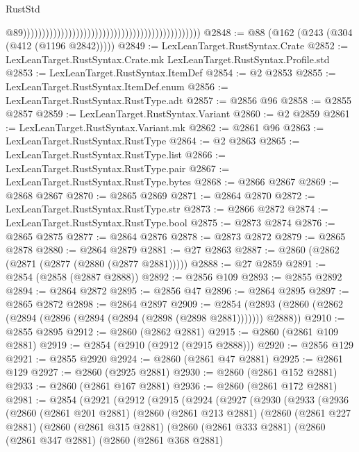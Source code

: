 \begin{lexlean}{RustStd}
\begin{coremodule}
                                                                                                  @89)))))))))))))))))))))))))))))))))))))))))))))))
@2848 := @88 (@162 (@243 (@304 (@412 (@1196 @2842)))))
@2849 := LexLeanTarget.RustSyntax.Crate
@2852 := LexLeanTarget.RustSyntax.Crate.mk LexLeanTarget.RustSyntax.Profile.std
@2853 := LexLeanTarget.RustSyntax.ItemDef
@2854 := @2 @2853
@2855 := LexLeanTarget.RustSyntax.ItemDef.enum
@2856 := LexLeanTarget.RustSyntax.RustType.adt
@2857 := @2856 @96
@2858 := @2855 @2857
@2859 := LexLeanTarget.RustSyntax.Variant
@2860 := @2 @2859
@2861 := LexLeanTarget.RustSyntax.Variant.mk
@2862 := @2861 @96
@2863 := LexLeanTarget.RustSyntax.RustType
@2864 := @2 @2863
@2865 := LexLeanTarget.RustSyntax.RustType.list
@2866 := LexLeanTarget.RustSyntax.RustType.pair
@2867 := LexLeanTarget.RustSyntax.RustType.bytes
@2868 := @2866 @2867
@2869 := @2868 @2867
@2870 := @2865 @2869
@2871 := @2864 @2870
@2872 := LexLeanTarget.RustSyntax.RustType.str
@2873 := @2866 @2872
@2874 := LexLeanTarget.RustSyntax.RustType.bool
@2875 := @2873 @2874
@2876 := @2865 @2875
@2877 := @2864 @2876
@2878 := @2873 @2872
@2879 := @2865 @2878
@2880 := @2864 @2879
@2881 := @27 @2863
@2887 := @2860 (@2862 (@2871 (@2877 (@2880 (@2877 @2881)))))
@2888 := @27 @2859
@2891 := @2854 (@2858 (@2887 @2888))
@2892 := @2856 @109
@2893 := @2855 @2892
@2894 := @2864 @2872
@2895 := @2856 @47
@2896 := @2864 @2895
@2897 := @2865 @2872
@2898 := @2864 @2897
@2909 := @2854 (@2893 (@2860 (@2862 (@2894 (@2896 (@2894 (@2894 (@2898 (@2898 @2881))))))) @2888))
@2910 := @2855 @2895
@2912 := @2860 (@2862 @2881)
@2915 := @2860 (@2861 @109 @2881)
@2919 := @2854 (@2910 (@2912 (@2915 @2888)))
@2920 := @2856 @129
@2921 := @2855 @2920
@2924 := @2860 (@2861 @47 @2881)
@2925 := @2861 @129
@2927 := @2860 (@2925 @2881)
@2930 := @2860 (@2861 @152 @2881)
@2933 := @2860 (@2861 @167 @2881)
@2936 := @2860 (@2861 @172 @2881)
@2981 := @2854
    (@2921
      (@2912
        (@2915
          (@2924
            (@2927
              (@2930
                (@2933
                  (@2936
                    (@2860
                      (@2861 @201 @2881)
                      (@2860
                        (@2861 @213 @2881)
                        (@2860
                          (@2861 @227 @2881)
                          (@2860
                            (@2861 @315 @2881)
                            (@2860
                              (@2861 @333 @2881)
                              (@2860
                                (@2861 @347 @2881)
                                (@2860
                                  (@2861 @368 @2881)

\end{coremodule}
\end{lexlean}
